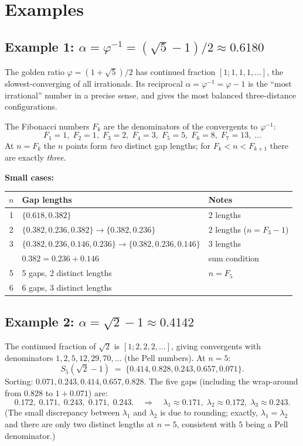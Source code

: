 \section*{Examples}

\subsection*{Example 1: $\alpha = \varphi^{-1} = (\sqrt{5}-1)/2 \approx 0.6180$}

The golden ratio $\varphi = (1+\sqrt{5})/2$ has continued fraction
$[1; 1, 1, 1, \ldots]$, the slowest-converging of all irrationals. Its
reciprocal $\alpha = \varphi^{-1} = \varphi - 1$ is the ``most irrational''
number in a precise sense, and gives the most balanced three-distance
configurations.

\medskip
\noindent The Fibonacci numbers $F_k$ are the denominators of the convergents to
$\varphi^{-1}$:
\[
  F_1=1,\; F_2=1,\; F_3=2,\; F_4=3,\; F_5=5,\; F_6=8,\; F_7=13,\;\ldots
\]
At $n = F_k$ the $n$ points form \emph{two} distinct gap lengths; for
$F_k < n < F_{k+1}$ there are exactly \emph{three}.

\medskip
\noindent\textbf{Small cases:}

\begin{center}
\begin{tabular}{cll}
\hline
$n$ & Gap lengths & Notes \\
\hline
1 & $\{0.618, 0.382\}$ & 2 lengths \\
2 & $\{0.382, 0.236, 0.382\} \to \{0.382, 0.236\}$ & 2 lengths ($n=F_3-1$)\\
3 & $\{0.382, 0.236, 0.146, 0.236\} \to \{0.382, 0.236, 0.146\}$ & 3 lengths \\
  & $0.382 = 0.236 + 0.146$ & sum condition \\
5 & 5 gaps, 2 distinct lengths & $n = F_5$ \\
6 & 6 gaps, 3 distinct lengths & \\
\hline
\end{tabular}
\end{center}

\subsection*{Example 2: $\alpha = \sqrt{2} - 1 \approx 0.4142$}

The continued fraction of $\sqrt{2}$ is $[1; 2, 2, 2, \ldots]$, giving
convergents with denominators $1, 2, 5, 12, 29, 70, \ldots$ (the Pell numbers).
At $n = 5$:
\[
  S_5(\sqrt{2}-1) \;=\; \{0.414, 0.828, 0.243, 0.657, 0.071\}.
\]
Sorting: $0.071, 0.243, 0.414, 0.657, 0.828$. The five gaps (including the
wrap-around from $0.828$ to $1+0.071$) are:
\[
  0.172,\; 0.171,\; 0.243,\; 0.171,\; 0.243.
  \quad\Longrightarrow\quad
  \lambda_1 \approx 0.171,\; \lambda_2 \approx 0.172,\; \lambda_3 \approx 0.243.
\]
(The small discrepancy between $\lambda_1$ and $\lambda_2$ is due to rounding;
exactly, $\lambda_1 = \lambda_2$ and there are only two distinct lengths at
$n = 5$, consistent with $5$ being a Pell denominator.)

